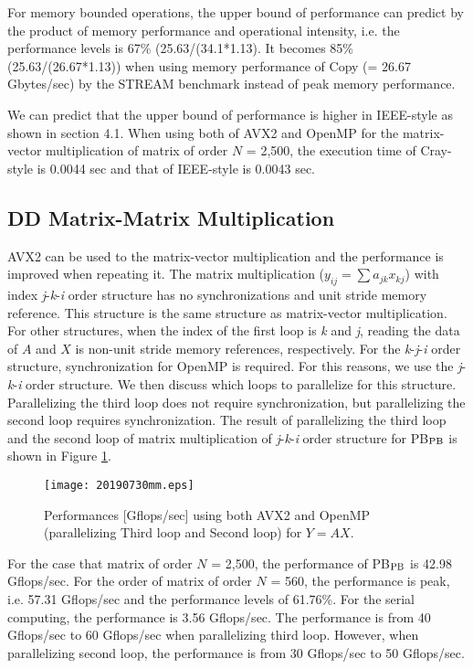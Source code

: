 \documentclass{IOS-Book-Article}
\begin{document}
For memory bounded operations, the upper bound of performance can predict by the product of memory performance and operational intensity, i.e. the performance levels is 67\% (25.63/(34.1*1.13). It becomes 85\% (25.63/(26.67*1.13)) when using memory performance of Copy (= 26.67 Gbytes/sec) by the STREAM benchmark instead of peak memory performance.

We can predict that the upper bound of performance is higher in IEEE-style as shown in section 4.1. When using both of AVX2 and OpenMP for the matrix-vector multiplication of matrix of order $N$ = 2,500, the execution time of Cray-style is 0.0044 sec and that of IEEE-style is 0.0043 sec.

\subsection{DD Matrix-Matrix Multiplication}
AVX2 can be used to the matrix-vector multiplication and the performance is improved when repeating it. The matrix multiplication ($y_{ij}=\sum a_{jk}x_{kj}$) with index {\it j}-{\it k}-{\it i} order structure has no synchronizations and unit stride memory reference. This structure is the same structure as matrix-vector multiplication. For other structures, when the index of the first loop is {\it k} and {\it j}, reading the data of $A$ and $X$ is non-unit stride memory references, respectively. For the {\it k}-{\it j}-{\it i} order structure, synchronization for OpenMP is required. For this reasons, we use the {\it j}-{\it k}-{\it i} order structure. We then discuss which loops to parallelize for this structure. Parallelizing the third loop does not require synchronization, but parallelizing the second loop requires synchronization.
The result of parallelizing the third loop and the second loop of matrix multiplication of {\it j}-{\it k}-{\it i} order structure for PB$_{\rm{PB}}$ is shown in Figure \ref{figMM3}.

\begin{figure}[htbp]
  \begin{center}
    \texttt{[image: 20190730mm.eps]}
         \caption{Performances [Gflops/sec] using both AVX2 and OpenMP (parallelizing Third loop and Second loop) for $Y = AX$.}
    \label{figMM3}
  \end{center}
\end{figure}

For the case that matrix of order $N$ = 2,500, the performance of PB$_{\rm{PB}}$ is 42.98 Gflops/sec.
For the order of matrix of order $N$ = 560, the performance is peak, i.e. 57.31 Gflops/sec and the performance levels of 61.76\%. For the serial computing, the performance is 3.56 Gflops/sec.
The performance is from 40 Gflops/sec to 60 Gflops/sec when parallelizing third loop. However, when parallelizing second loop, the performance is from 30 Gflops/sec to 50 Gflops/sec. 
\end{document}
